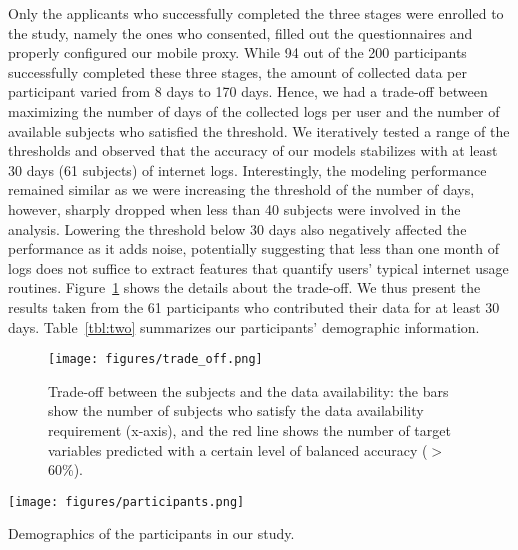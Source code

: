 Only the applicants who successfully completed the three stages were enrolled to the study, namely the ones who consented, filled out the questionnaires and properly configured our mobile proxy. While 94 out of the 200 participants successfully completed these three stages, the amount of collected data per participant varied from 8 days to 170 days. Hence, we had a trade-off between maximizing the number of days of the collected logs per user and the number of available subjects who satisfied the threshold. We iteratively tested a range of the thresholds and observed that the accuracy of our models stabilizes with at least 30 days (61 subjects) of internet logs. Interestingly, the modeling performance remained similar as we were increasing the threshold of the number of days, however, sharply dropped when less than 40 subjects were involved in the analysis. Lowering the threshold below 30 days also negatively affected the performance as it adds noise, potentially suggesting that less than one month of logs does not suffice to extract features that quantify users' typical internet usage routines. Figure~\ref{fig:zero} shows the details about the trade-off. We thus present the results taken from the 61 participants who contributed their data for at least 30 days. Table~\ref{tbl:two} summarizes our participants' demographic information.

\begin{figure}
  \texttt{[image: figures/trade\_off.png]}
  \caption{Trade-off between the subjects and the data availability: the bars show the number of subjects who satisfy the data availability requirement (x-axis), and the red line shows the number of target variables predicted with a certain level of balanced accuracy ($>$ 60\%).}
  \label{fig:zero}
\end{figure}

\begin{table}
  \texttt{[image: figures/participants.png]}
  \caption{Demographics of the participants in our study.}
  \label{tbl:two}
\end{table}

